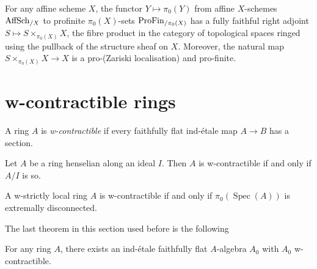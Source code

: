 \begin{definition}%
    \label{lem:decouple-topology-from-algebra}

    For any affine scheme $X$, the functor $Y \mapsto \pi_0(Y)$ from affine $X$-schemes \(\operatorname{AffSch}_{/X}\) to profinite $\pi_0(X)$-sets \(\operatorname{ProFin}_{/\pi_0(X)}\) has a fully faithful right adjoint $S \mapsto S \times_{\pi_0(X)} X$, the fibre product in the category of topological spaces ringed using the pullback of the structure sheaf on $X$. Moreover, the natural map $S \times_{\pi_0(X)} X \to X$ is a pro-(Zariski localisation) and pro-finite.
\end{definition}

\section{w-contractible rings}

\begin{definition}
A ring \(A\) is \emph{w-contractible} if every faithfully flat ind-\'etale map \(A \to B\) has a section.
    \label{def:w-contractible-ring}
\end{definition}

\begin{lemma}
    \label{lem:w-contractible-henselian}

    Let $A$ be a ring henselian along an ideal $I$. Then $A$ is w-contractible if and only if $A/I$ is so.
\end{lemma}

\begin{lemma}
    \label{lem:w-strictly-local-pi0-extremally-disconnected}
    A w-strictly local ring $A$ is w-contractible if and only if $\pi_0(\operatorname{Spec}(A))$ is extremally disconnected.
\end{lemma}

The last theorem in this section used before \cite[Theorem 5.6.2]{proetale} is the following 

\begin{lemma}
    For any ring $A$, there exists an ind-étale faithfully flat $A$-algebra $A_0$ with $A_0$ w-contractible.
    \label{thm:ind-etale-w-contractible-cover-exists}
\end{lemma}

